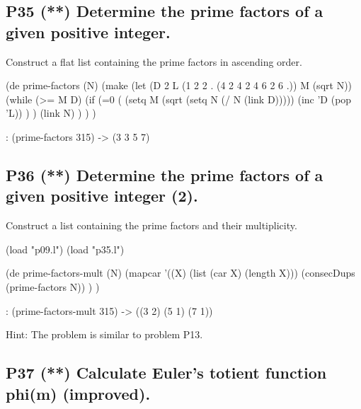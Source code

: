 \pagebreak{}
\subsection*{{P35} (**) Determine the prime factors of a
given positive integer.}
\label{sec:99-problems-P35}

Construct a flat list containing the prime factors in ascending order.

\begin{wideverbatim}

(de prime-factors (N)
   (make
      (let (D 2  L (1 2 2 . (4 2 4 2 4 6 2 6 .))  M (sqrt N))
         (while (>= M D)
            (if (=0 (%
               (setq M (sqrt (setq N (/ N (link D)))))
               (inc 'D (pop 'L)) ) )
         (link N) ) ) )

\end{wideverbatim}

\begin{wideverbatim}
   : (prime-factors 315)
   -> (3 3 5 7)
\end{wideverbatim}


\subsection*{{P36} (**) Determine the prime factors of a
given positive integer (2).}
\label{sec:99-problems-P36}

Construct a list containing the prime factors and their multiplicity.

\begin{wideverbatim}

(load "p09.l")
(load "p35.l")

(de prime-factors-mult (N)
   (mapcar
      '((X) (list (car X) (length X)))
      (consecDups (prime-factors N)) ) )

\end{wideverbatim}

\begin{wideverbatim}
   : (prime-factors-mult 315)
   -> ((3 2) (5 1) (7 1))
\end{wideverbatim}

Hint: The problem is similar to problem P13.

\pagebreak{}
\subsection*{{P37} (**) Calculate Euler's totient
function phi(m) (improved).}
\label{sec:99-problems-P37}


